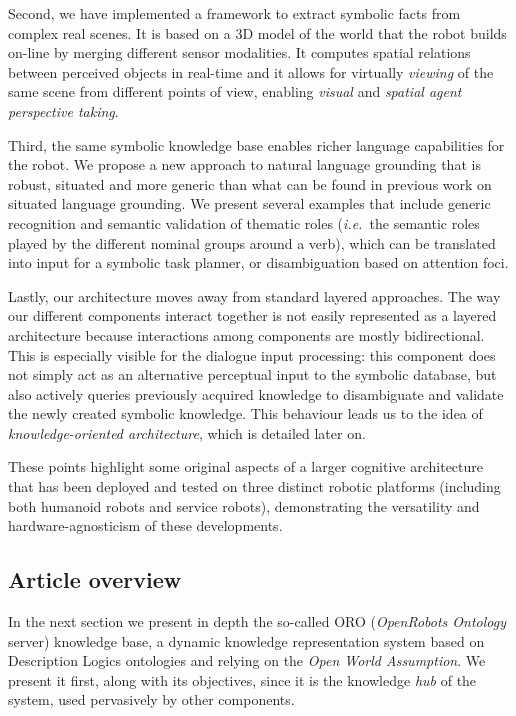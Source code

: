 \documentclass[twocolumn]{svjour3}
\newcommand{\ie}{{\textit{i.e.~}}}
\begin{document}
Second, we have implemented a framework to extract symbolic facts from complex
real scenes. It is based on a 3D model of the world that the robot builds
on-line by merging different sensor modalities. It computes spatial relations
between perceived objects in real-time and it allows for virtually \emph{viewing}
of the same scene from different points of view, enabling \emph{visual} and
\emph{spatial agent perspective taking}.

Third, the same symbolic knowledge base enables richer language capabilities
for the robot.  We propose a new approach to natural language grounding that is
robust, situated and more generic than what can be found in previous work
on situated language grounding. We present several examples that include
generic recognition and semantic validation of thematic roles (\ie the
semantic roles played by the different nominal groups around a verb), which
can be translated into input for a symbolic task planner, or disambiguation
based on attention foci.

Lastly, our architecture moves away from standard layered approaches. The way
our different components interact together is not easily represented as a
layered architecture because interactions among components are mostly
bidirectional.  This is especially visible for the dialogue input processing:
this component does not simply act as an alternative perceptual input to the
symbolic database, but also actively queries previously acquired knowledge to
disambiguate and validate the newly created symbolic knowledge. This behaviour
leads us to the idea of \emph{knowledge-oriented architecture}, which is
detailed later on.

These points highlight some original aspects of a larger cognitive architecture
that has been deployed and tested on three distinct robotic platforms
(including both humanoid robots and service robots), demonstrating the
versatility and hardware-agnosticism of these developments.

\subsection{Article overview}

In the next section we present in depth the so-called {\sc ORO}
(\emph{OpenRobots Ontology} server) knowledge base, a dynamic knowledge
representation system based on Description Logics ontologies and relying on the
\emph{Open World Assumption}. We present it first, along with its objectives,
since it is the knowledge \textit{hub} of the system, used pervasively by other
components.
\end{document}
